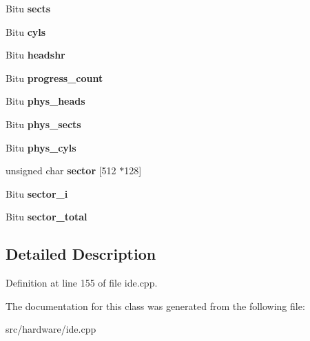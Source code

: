 \begin{DoxyCompactItemize}
\item 
\hypertarget{classIDEATADevice_a77463c48bf871a84d61a8b9bd1e95ffa}{Bitu {\bfseries sects}}\label{classIDEATADevice_a77463c48bf871a84d61a8b9bd1e95ffa}

\item 
\hypertarget{classIDEATADevice_a17435363559ff62f0d240f17f62c21cc}{Bitu {\bfseries cyls}}\label{classIDEATADevice_a17435363559ff62f0d240f17f62c21cc}

\item 
\hypertarget{classIDEATADevice_a907dbc2d9356cb6f98668573faf71242}{Bitu {\bfseries headshr}}\label{classIDEATADevice_a907dbc2d9356cb6f98668573faf71242}

\item 
\hypertarget{classIDEATADevice_a255e5d56bc9bf73d1cfdd542fd30126c}{Bitu {\bfseries progress\-\_\-count}}\label{classIDEATADevice_a255e5d56bc9bf73d1cfdd542fd30126c}

\item 
\hypertarget{classIDEATADevice_a917ccd0ef8076957499b62dd55a73377}{Bitu {\bfseries phys\-\_\-heads}}\label{classIDEATADevice_a917ccd0ef8076957499b62dd55a73377}

\item 
\hypertarget{classIDEATADevice_a15d352c5e1d3dcc12fc98b21c4ee3e40}{Bitu {\bfseries phys\-\_\-sects}}\label{classIDEATADevice_a15d352c5e1d3dcc12fc98b21c4ee3e40}

\item 
\hypertarget{classIDEATADevice_a99762c7f195dfffc524e3078b4a1e2bc}{Bitu {\bfseries phys\-\_\-cyls}}\label{classIDEATADevice_a99762c7f195dfffc524e3078b4a1e2bc}

\item 
\hypertarget{classIDEATADevice_aaf448a547054c85529e233d5381267d0}{unsigned char {\bfseries sector} \mbox{[}512 $\ast$128\mbox{]}}\label{classIDEATADevice_aaf448a547054c85529e233d5381267d0}

\item 
\hypertarget{classIDEATADevice_a28e1aaa1f0f87336ee5fe12212bdfdf1}{Bitu {\bfseries sector\-\_\-i}}\label{classIDEATADevice_a28e1aaa1f0f87336ee5fe12212bdfdf1}

\item 
\hypertarget{classIDEATADevice_a1eda9b2179b67dca4f5c850bff4a2c4c}{Bitu {\bfseries sector\-\_\-total}}\label{classIDEATADevice_a1eda9b2179b67dca4f5c850bff4a2c4c}

\end{DoxyCompactItemize}


\subsection{Detailed Description}


Definition at line 155 of file ide.\-cpp.



The documentation for this class was generated from the following file\-:\begin{DoxyCompactItemize}
\item 
src/hardware/ide.\-cpp\end{DoxyCompactItemize}
